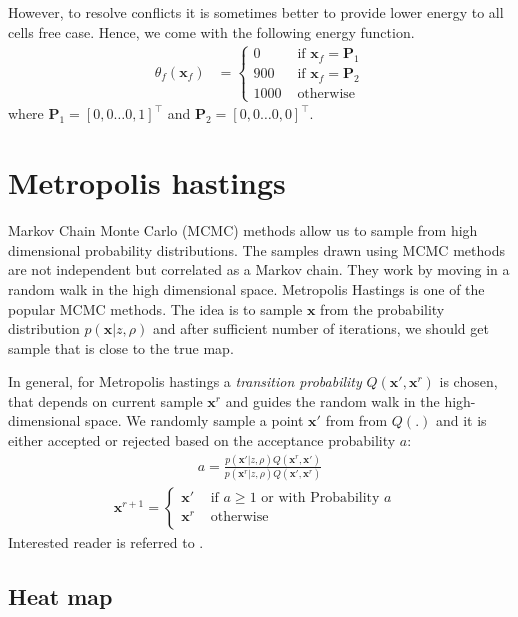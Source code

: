 \documentclass[letterpaper, 10 pt, conference]{ieeeconf} %
\newcommand{\vect}[1]{\mathbf{#1}}
\begin{document}
However, to resolve conflicts it is sometimes better to provide lower energy to all cells free case. Hence, we come with the following energy function.
\begin{align}
  \theta_f(\vect{x}_f) &= \begin{cases}
                     0 & \text{ if } \vect{x}_f = \vect{P}_1\\
                   900 & \text{ if } \vect{x}_f = \vect{P}_2\\
                  1000 & \text{ otherwise}
  \end{cases}
\end{align}
where $\vect{P}_1 = [0, 0 \dots 0, 1]^\top$ and $\vect{P}_2 = [0, 0 \dots 0, 0]^\top$.
\section{Metropolis hastings}
Markov Chain Monte Carlo (MCMC) methods allow us to sample from high dimensional probability distributions. The samples drawn using MCMC methods are not independent but correlated as a Markov chain. They work by moving in a random walk in the high dimensional space. Metropolis Hastings is one of the popular MCMC methods. The idea is to sample $\vect{x}$ from the probability distribution $p(\vect{x}|z, \rho)$ and after sufficient number of iterations, we should get sample that is close to the true map.

In general, for Metropolis hastings a \emph{transition probability} $Q(\vect{x}',
\vect{x}^r)$ is chosen, that depends on current sample $\vect{x}^r$ and guides the random
walk in the high-dimensional space. We randomly sample a point $\vect{x}'$ 
from from $Q(.)$ and it is either accepted or rejected based on the acceptance probability $a$:
\begin{align}
  a = \frac{p(\vect{x}'|z, \rho)Q(\vect{x}^r, \vect{x}')}
  {p(\vect{x}^r|z, \rho)Q(\vect{x}', \vect{x}^r)}
\end{align}
\begin{align}
  \vect{x}^{r+1} = \begin{cases}
    \vect{x}' & \text{ if $a \ge 1$ or with Probability $a$  }\\
    \vect{x}^r & \text{ otherwise}\\
  \end{cases}
\end{align}
Interested reader is referred to \cite{mackay1998introduction}.
\subsection{Heat map}
\end{document}
